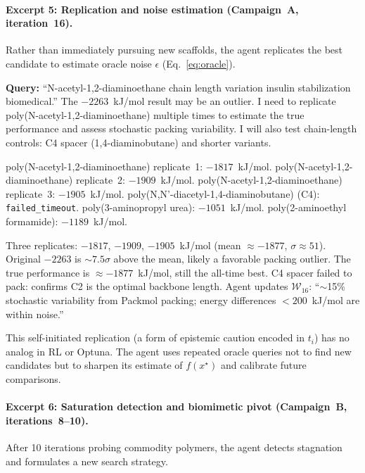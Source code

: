 \documentclass[twocolumn]{fairmeta}
\begin{document}
\paragraph{Excerpt 5: Replication and noise estimation (Campaign~A, iteration~16).}
Rather than immediately pursuing new scaffolds, the agent replicates the best candidate to estimate oracle noise $\epsilon$ (Eq.~\ref{eq:oracle}).

\begin{agentthought}
\scriptsize
\textbf{Query:} ``N-acetyl-1,2-diaminoethane chain length variation insulin stabilization biomedical.''
The $-2263$~kJ/mol result may be an outlier.
I need to replicate poly(N-acetyl-1,2-diaminoethane) multiple times to estimate the true performance and assess stochastic packing variability.
I will also test chain-length controls: C4 spacer (1,4-diaminobutane) and shorter variants.
\end{agentthought}

\begin{toolcall}
\scriptsize
poly(N-acetyl-1,2-diaminoethane) replicate~1: $-1817$~kJ/mol.
poly(N-acetyl-1,2-diaminoethane) replicate~2: $-1909$~kJ/mol.
poly(N-acetyl-1,2-diaminoethane) replicate~3: $-1905$~kJ/mol.
poly(N,N'-diacetyl-1,4-diaminobutane) (C4): \texttt{failed\_timeout}.
poly(3-aminopropyl urea): $-1051$~kJ/mol.
poly(2-aminoethyl formamide): $-1189$~kJ/mol.
\end{toolcall}

\begin{observation}
\scriptsize
Three replicates: $-1817$, $-1909$, $-1905$~kJ/mol (mean $\approx -1877$, $\sigma \approx 51$).
Original $-2263$ is ${\sim}7.5\sigma$ above the mean, likely a favorable packing outlier.
The true performance is $\approx -1877$~kJ/mol, still the all-time best.
C4 spacer failed to pack: confirms C2 is the optimal backbone length.
Agent updates $\mathcal{W}_{16}$: ``${\sim}$15\% stochastic variability from Packmol packing; energy differences $< 200$~kJ/mol are within noise.''
\end{observation}

\noindent This self-initiated replication (a form of epistemic caution encoded in $t_i$) has no analog in RL or Optuna.
The agent uses repeated oracle queries not to find new candidates but to sharpen its estimate of $f(x^\star)$ and calibrate future comparisons.

\paragraph{Excerpt 6: Saturation detection and biomimetic pivot (Campaign~B, iterations~8--10).}
After 10 iterations probing commodity polymers, the agent detects stagnation and formulates a new search strategy.
\end{document}
